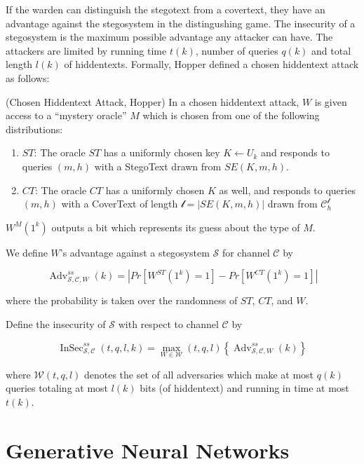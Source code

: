 \documentclass[english,version-2020-11]{uzl-thesis}
\begin{document}
If the warden can distinguish the stegotext from a covertext, they have an advantage against the stegosystem in the distingushing game.
The insecurity of a stegosystem is the maximum possible advantage any attacker can have.
The attackers are limited by running time $t(k)$, number of queries $q(k)$ and total length $l(k)$ of hiddentexts.
Formally, Hopper defined a chosen hiddentext attack as follows:

\begin{definition}
(Chosen Hiddentext Attack, Hopper) In a chosen hiddentext attack, $W$ is given access to a ``mystery oracle'' $M$ which is chosen from one of the following distributions:

\begin{enumerate}
\item $ST$: The oracle $ST$ has a uniformly chosen key $K \leftarrow U_k$ and responds to queries $(m, h)$ with a StegoText drawn from $SE(K, m, h)$.
\item $CT$: The oracle $CT$ has a uniformly chosen $K$ as well, and responds to queries $(m, h)$ with a CoverText of length $\mathcal{l} = |SE(K, m, h)|$ drawn from $\mathcal{C}_h^{\mathcal{l}}$
\end{enumerate}

$W^M(1^k)$ outputs a bit which represents its guess about the type of $M$.

We define $W$'s advantage against a stegosystem $\mathcal{S}$ for channel $\mathcal{C}$ by

$$\mathop{Adv}_{\mathcal{S}, \mathcal{C}, W}^{ss}(k) = |Pr[W^{ST}(1^k)=1] - Pr[W^{CT}(1^k)=1]|$$ 

where the probability is taken over the randomness of $ST$, $CT$, and $W$. 

Define the insecurity of $\mathcal{S}$ with respect to channel $\mathcal{C}$ by

$$\mathop{InSec}_{\mathcal{S}, \mathcal{C}}^{ss}(t, q, l, k) = \max_{W \in \mathcal{W}}(t, q, l) \left\{ \mathop{Adv}_{\mathcal{S}, \mathcal{C}, W}^{ss}(k) \right\}$$

where $\mathcal{W}(t, q, l)$ denotes the set of all adversaries which make at most $q(k)$ queries totaling at most $l(k)$ bits (of hiddentext) and running in time at most $t(k)$.
\end{definition}

\section{Generative Neural Networks}
\end{document}
